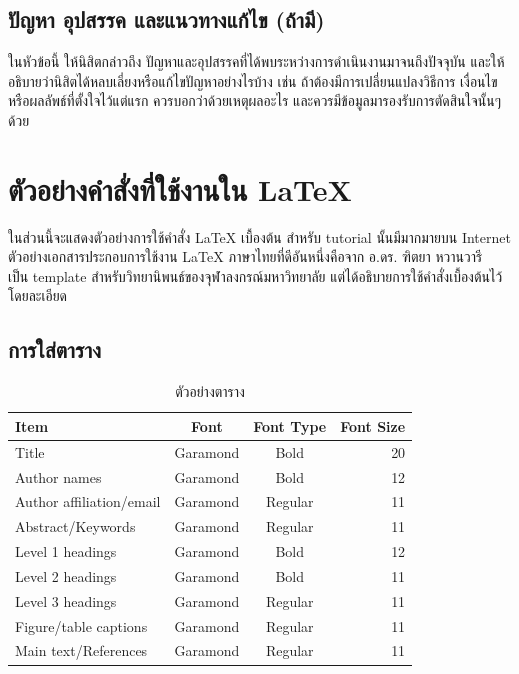 \documentclass[11pt,a4paper]{article}
\begin{document}
\subsection{ปัญหา อุปสรรค และแนวทางแก้ไข (ถ้ามี)}
ในหัวข้อนี้ ให้นิสิตกล่าวถึง ปัญหาและอุปสรรคที่ได้พบระหว่างการดำเนินงานมาจนถึงปัจจุบัน และให้อธิบายว่านิสิตได้หลบเลี่ยงหรือแก้ไขปัญหาอย่างไรบ้าง เช่น ถ้าต้องมีการเปลี่ยนแปลงวิธีการ เงื่อนไข หรือผลลัพธ์ที่ตั้งใจไว้แต่แรก ควรบอกว่าด้วยเหตุผลอะไร และควรมีข้อมูลมารองรับการตัดสินใจนั้นๆ ด้วย

\section{ตัวอย่างคำสั่งที่ใช้งานใน LaTeX}
ในส่วนนี้จะแสดงตัวอย่างการใช้คำสั่ง LaTeX เบื้องต้น สำหรับ tutorial นั้นมีมากมายบน Internet ตัวอย่างเอกสารประกอบการใช้งาน LaTeX ภาษาไทยที่ดีอันหนึ่งคือจาก อ.ดร. ฑิตยา หวานวารี~\cite{cuthesis} เป็น template สำหรับวิทยานิพนธ์ของจุฬาลงกรณ์มหาวิทยาลัย แต่ได้อธิบายการใช้คำสั่งเบื้องต้นไว้โดยละเอียด

\subsection{การใส่ตาราง}
\begin{table}[ht]
    \centering
    \caption{ตัวอย่างตาราง}
    \vspace{3mm}
    \begin{tabular}{|l|c|c|r|} \hline
        Item                     & Font     & Font Type & Font Size \\ \hline
        Title                    & Garamond & Bold      & 20        \\
        Author names             & Garamond & Bold      & 12        \\
        Author affiliation/email & Garamond & Regular   & 11        \\
        Abstract/Keywords        & Garamond & Regular   & 11        \\
        Level 1 headings         & Garamond & Bold      & 12        \\
        Level 2 headings         & Garamond & Bold      & 11        \\
        Level 3 headings         & Garamond & Regular   & 11        \\
        Figure/table captions    & Garamond & Regular   & 11        \\
        Main text/References     & Garamond & Regular   & 11        \\ \hline
    \end{tabular}
\end{table}
\end{document}
